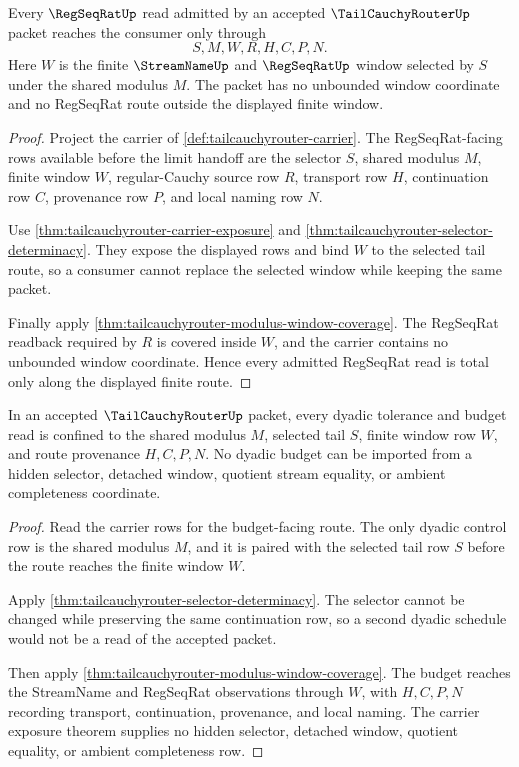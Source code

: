 \begin{theorem}
\label{thm:tail-cauchy-router-regseqrat-route-totality}
Every $\RegSeqRatUp$ read admitted by an accepted $\TailCauchyRouterUp$ packet reaches the consumer only through
$$
S,M,W,R,H,C,P,N.
$$
Here $W$ is the finite $\StreamNameUp$ and $\RegSeqRatUp$ window selected by $S$ under the shared modulus $M$. The packet has no unbounded window coordinate and no RegSeqRat route outside the displayed finite window.
\end{theorem}
\begin{proof}
Project the carrier of \autoref{def:tailcauchyrouter-carrier}. The RegSeqRat-facing rows available before the limit handoff are the selector $S$, shared modulus $M$, finite window $W$, regular-Cauchy source row $R$, transport row $H$, continuation row $C$, provenance row $P$, and local naming row $N$.

Use \autoref{thm:tailcauchyrouter-carrier-exposure} and \autoref{thm:tailcauchyrouter-selector-determinacy}. They expose the displayed rows and bind $W$ to the selected tail route, so a consumer cannot replace the selected window while keeping the same packet.

Finally apply \autoref{thm:tailcauchyrouter-modulus-window-coverage}. The RegSeqRat readback required by $R$ is covered inside $W$, and the carrier contains no unbounded window coordinate. Hence every admitted RegSeqRat read is total only along the displayed finite route.
\end{proof}

\begin{theorem}
\label{thm:tail-cauchy-router-dyadic-budget-nonescape}
In an accepted $\TailCauchyRouterUp$ packet, every dyadic tolerance and budget read is confined to the shared modulus $M$, selected tail $S$, finite window row $W$, and route provenance $H,C,P,N$. No dyadic budget can be imported from a hidden selector, detached window, quotient stream equality, or ambient completeness coordinate.
\end{theorem}
\begin{proof}
Read the carrier rows for the budget-facing route. The only dyadic control row is the shared modulus $M$, and it is paired with the selected tail row $S$ before the route reaches the finite window $W$.

Apply \autoref{thm:tailcauchyrouter-selector-determinacy}. The selector cannot be changed while preserving the same continuation row, so a second dyadic schedule would not be a read of the accepted packet.

Then apply \autoref{thm:tailcauchyrouter-modulus-window-coverage}. The budget reaches the StreamName and RegSeqRat observations through $W$, with $H,C,P,N$ recording transport, continuation, provenance, and local naming. The carrier exposure theorem supplies no hidden selector, detached window, quotient equality, or ambient completeness row.
\end{proof}

